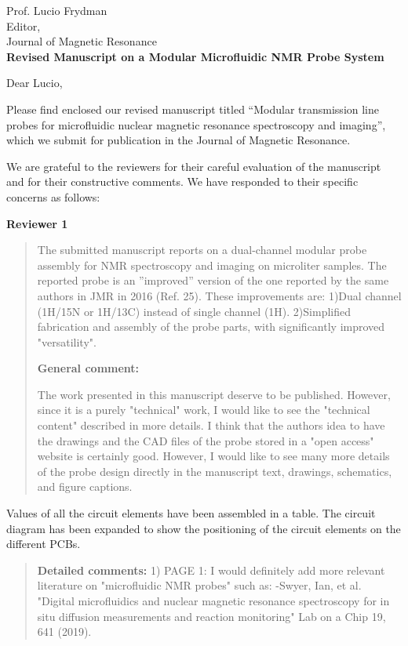 \documentclass{mu-soton-letter}
\newenvironment{reviewer} {\begin{quote}\color{black!50}} {\end{quote}}
\begin{document}
\begin{letter}{Prof. Lucio Frydman\\
  Editor,\\
  Journal of Magnetic Resonance\\[2cm]
  \textbf{Revised Manuscript on a Modular Microfluidic NMR Probe System}}
\vfill
\opening{Dear Lucio,
}
Please find enclosed our revised manuscript titled
``Modular transmission line probes for microfluidic nuclear
magnetic resonance spectroscopy and imaging'', which we submit for publication
in the Journal of Magnetic Resonance.

We are grateful to the reviewers for their careful evaluation of the manuscript
and for their constructive comments. We have responded to their specific concerns
as follows:


\textbf{Reviewer 1}

\begin{reviewer}
{The submitted manuscript reports on a dual-channel modular probe assembly for NMR spectroscopy and imaging on microliter samples.
  The reported probe is an ''improved'' version of the one reported by the same authors in JMR in 2016 (Ref. 25).
  These improvements are:
  1)Dual channel (1H/15N or 1H/13C) instead of single channel (1H).
  2)Simplified fabrication and assembly of the probe parts, with significantly improved "versatility".}

  \textcolor{black!50}{ \textbf{General comment:}}


  The work presented in this manuscript deserve to be published. However, since it is a purely "technical" work, I would like to see the "technical content" described in more details.
  I think that the authors idea to have the drawings and the CAD files of the probe stored in a "open access" website is certainly good. However, I would like to see many more details of the probe design directly in the manuscript text, drawings, schematics, and figure captions.
\end{reviewer}


Values of all the circuit elements have been assembled in a table. The circuit diagram has been expanded to show the positioning of the circuit elements on the different PCBs.


\begin{reviewer}
\textbf{Detailed comments:}
1) PAGE 1:  I would definitely add more relevant literature on "microfluidic NMR probes" such as:
-Swyer, Ian, et al. "Digital microfluidics and nuclear magnetic resonance spectroscopy for in situ diffusion measurements and reaction monitoring" Lab on a Chip 19, 641 (2019).


\end{reviewer}
\end{letter}
\end{document}
